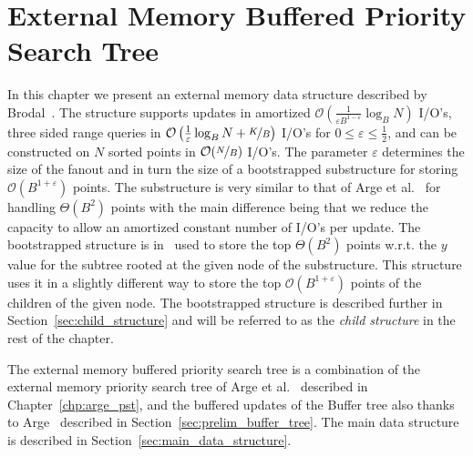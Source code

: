 \documentclass[twoside,11pt,openright]{report}
\def \epsilon {\varepsilon}
\begin{document}
\chapter{External Memory Buffered Priority Search Tree}
\label{chp:epst}
In this chapter we present an external memory data structure described by Brodal~\cite{DBLP:journals/corr/Brodal15}. The structure supports updates in amortized $\mathcal{O}\left(\frac{1}{\epsilon B^{1-\epsilon}} \log_B N\right)$ I/O's, three sided range queries in $\mathcal{O}\left(\frac{1}{\epsilon}\log_B N + \nicefrac{K}{B}\right)$ I/O's for $0 \leq \epsilon \leq \frac{1}{2}$, and can be constructed on $N$ sorted points in $\mathcal{O}(\nicefrac{N}{B})$ I/O's. The parameter $\epsilon$ determines the size of the fanout and in turn the size of a bootstrapped substructure for storing $\mathcal{O}(B^{1+\epsilon})$ points.
The substructure is very similar to that of Arge et al.~\cite[Section~3.1]{arge_vitter_2003} for handling $\Theta(B^2)$ points with the main difference being that we reduce the capacity to allow an amortized constant number of I/O's per update. The bootstrapped structure is in~\cite{arge_vitter_2003} used to store the top $\Theta(B^2)$ points w.r.t. the $y$ value for the subtree rooted at the given node of the substructure. This structure uses it in a slightly different way to store the top $\mathcal{O}(B^{1+\epsilon})$ points of the children of the given  node. The bootstrapped structure is described further in Section~\ref{sec:child_structure} and will be referred to as the \textit{child structure} in the rest of the chapter.

The external memory buffered priority search tree is a combination of the external memory priority search tree of Arge et al.~\cite{arge_samoladas_vitter_1999} described in Chapter~\ref{chp:arge_pst}, and the buffered updates of the Buffer tree also thanks to Arge~\cite{Arge:1995:BTN:645930.672850} described in Section~\ref{sec:prelim_buffer_tree}. The main data structure is described in Section~\ref{sec:main_data_structure}.
\end{document}
